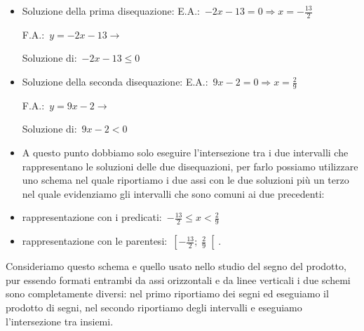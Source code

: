 \begin{exrig}
\begin{esempio}
\begin{itemize}
 \item Soluzione della prima disequazione:
 \subitem E.A.:~$-2 x -13=0 \Rightarrow x=-\frac{13}{2}$
 \subitem
  \begin{minipage}{.25\textwidth}
   F.A.:~$y=-2 x -13 \rightarrow $
  \end{minipage}
  \begin{minipage}{.30\textwidth}
  
  \end{minipage}
 \subitem
  \begin{minipage}{.40\textwidth}
   Soluzione di:~$-2 x -13 \le 0$
  \end{minipage}
  \begin{minipage}{.30\textwidth}
  
  \end{minipage}
 \item Soluzione della seconda disequazione:
 \subitem E.A.:~$9 x -2=0 \Rightarrow x=\frac{2}{9}$
 \subitem
  \begin{minipage}{.25\textwidth}
   F.A.:~$y=9 x -2 \rightarrow $
  \end{minipage}
  \begin{minipage}{.30\textwidth}
  
  \end{minipage}
 \subitem
  \begin{minipage}{.40\textwidth}
   Soluzione di:~$9 x -2 < 0$
  \end{minipage}
  \begin{minipage}{.30\textwidth}
  
  \end{minipage}
 \item A questo punto dobbiamo solo eseguire l'intersezione tra i due intervalli 
  che rappresentano le soluzioni delle due disequazioni, per farlo possiamo 
  utilizzare uno schema nel quale riportiamo i due assi con le due soluzioni 
  più un terzo nel quale evidenziamo gli intervalli che sono comuni ai due 
  precedenti: 
  
 \item rappresentazione con i predicati:~$-\frac{13}{2} \le x < \frac{2}{9}$ 
 \item rappresentazione con le parentesi:~$\left[-\frac{13}{2}; \; \frac{2}{9} \right[$. 
\end{itemize}
 \end{esempio}
\end{exrig}

\osservazione Consideriamo questo schema e quello usato nello studio del 
segno del prodotto, pur essendo formati entrambi da assi orizzontali e 
da linee verticali i due schemi sono completamente diversi: 
nel primo riportiamo dei segni ed eseguiamo il prodotto di segni, 
nel secondo riportiamo degli intervalli e eseguiamo l'intersezione tra 
insiemi. 

